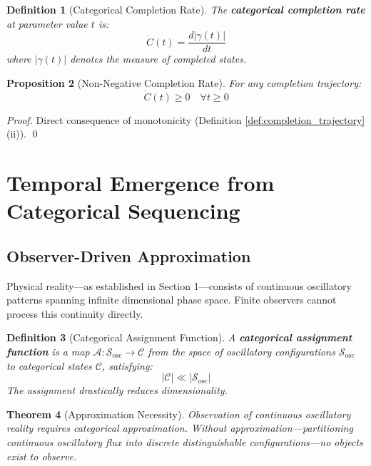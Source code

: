 \documentclass[11pt]{article}
\newtheorem{theorem}{Theorem}[section]
\newtheorem{definition}[theorem]{Definition}
\newtheorem{proposition}[theorem]{Proposition}
\theoremstyle{remark}
\begin{document}
\begin{definition}[Categorical Completion Rate]
\label{def:completion_rate}
The \textbf{categorical completion rate} at parameter value $t$ is:
\begin{equation}
\dot{C}(t) = \frac{d|\gamma(t)|}{dt}
\end{equation}
where $|\gamma(t)|$ denotes the measure of completed states.
\end{definition}

\begin{proposition}[Non-Negative Completion Rate]
\label{prop:nonnegative_rate}
For any completion trajectory:
\begin{equation}
\dot{C}(t) \geq 0 \quad \forall t \geq 0
\end{equation}
\end{proposition}

\begin{proof}
Direct consequence of monotonicity (Definition \ref{def:completion_trajectory}(ii)). \qed
\end{proof}

\section{Temporal Emergence from Categorical Sequencing}

\subsection{Observer-Driven Approximation}

Physical reality—as established in Section 1—consists of continuous oscillatory patterns spanning infinite dimensional phase space. Finite observers cannot process this continuity directly.

\begin{definition}[Categorical Assignment Function]
\label{def:categorical_assignment}
A \textbf{categorical assignment function} is a map $\mathcal{A}: \mathcal{S}_{\text{osc}} \to \mathcal{C}$ from the space of oscillatory configurations $\mathcal{S}_{\text{osc}}$ to categorical states $\mathcal{C}$, satisfying:
\begin{equation}
|\mathcal{C}| \ll |\mathcal{S}_{\text{osc}}|
\end{equation}
The assignment drastically reduces dimensionality.
\end{definition}

\begin{theorem}[Approximation Necessity]
\label{thm:approximation_necessity}
Observation of continuous oscillatory reality requires categorical approximation. Without approximation—partitioning continuous oscillatory flux into discrete distinguishable configurations—no objects exist to observe.
\end{theorem}
\end{document}
